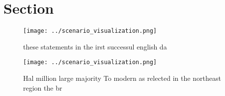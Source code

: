 \documentclass[a4paper]{article}
\begin{document}
\section{Section}

\begin{figure}
\centering
\texttt{[image: ../scenario\_visualization.png]}
\caption{these statements in the irst successul english da
}
\end{figure}
 
\begin{figure}
\centering
\texttt{[image: ../scenario\_visualization.png]}
\caption{Hal million large majority To modern as relected in the northeast region the br
}
\end{figure}
 
\end{document}
